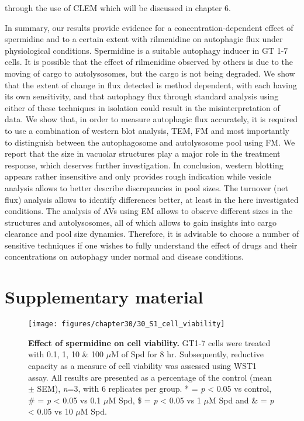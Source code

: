through the use of CLEM which will be discussed in chapter 6.

In summary, our results provide evidence for a concentration-dependent effect of spermidine and to a certain extent with rilmenidine on autophagic flux under physiological conditions. Spermidine is a suitable autophagy inducer in GT 1-7 cells. It is possible that the effect of rilmenidine observed by others is due to the moving of cargo to autolysosomes, but the cargo is not being degraded. We show that the extent of change in flux detected is method dependent, with each having its own sensitivity, and that autophagy flux through standard analysis using either of these techniques in isolation could result in the misinterpretation of data. We show that,  in order to measure autophagic flux accurately, it is required to use a combination of western blot analysis, TEM, FM and most importantly to distinguish between the autophagosome and autolysosome pool using FM. We report that the size in vacuolar structures play a major role in the treatment response, which deserves further investigation. In conclusion, western blotting appears rather insensitive and only provides rough indication while vesicle analysis allows to better describe discrepancies in pool sizes. The turnover (net flux) analysis allows to identify differences better, at least in the here investigated conditions. The analysis of AVs using EM allows to observe different sizes in the structures and autolysosomes, all of which allows to gain insights into cargo clearance and pool size dynamics. Therefore, it is advisable to choose a number of sensitive techniques if one wishes to fully understand the effect of drugs and their concentrations on autophagy under normal and disease conditions.

\section*{Supplementary material}\label{sec:supp_mat}
\begin{figure}[!htbp]
  \center
    \texttt{[image: figures/chapter30/30\_S1\_cell\_viability]}
  	\caption[Effect of spermidine on cell viability]{\textbf{Effect of spermidine on cell viability.} GT1-7 cells were treated with 0.1, 1, 10 \& 100 $\mu$M of Spd for 8 hr. Subsequently, reductive capacity as a measure of cell viability was assessed using WST1 assay. All results are presented as a percentage of the control (mean $\pm$ SEM), \textit{n}=3, with 6 replicates per group. * = \textit{p} < 0.05 vs control, \# = \textit{p} < 0.05 vs 0.1 $\mu$M Spd, \$ = \textit{p} < 0.05 vs 1 $\mu$M Spd and \& = \textit{p} < 0.05 vs 10 $\mu$M Spd.}
  \label{fig:30_S1_cell_viability}
\end{figure}